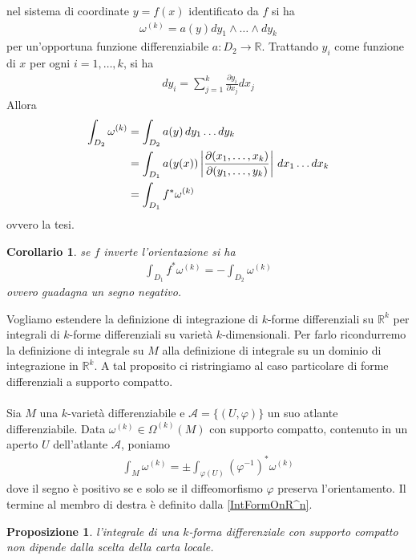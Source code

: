 \documentclass[oneside, 11pt]{amsbook}
\makeatletter
\newcommand{\0}{{(0)}}
\newcommand{\3}{{(3)}}
\theoremstyle{colonplain}
\newtheorem{prop}[thm]{Proposizione}
\newtheorem{cor}[thm]{Corollario}
\theoremstyle{colondefinition}
\theoremstyle{colonremark}
\numberwithin{equation}{chapter}
\renewcommand{\proofname}{Dimostrazione}
\renewenvironment{proof}[1][\proofname]{\par
  \pushQED{\qed}%
  \normalfont \topsep6\p@\@plus6\p@\relax
  \trivlist
  \item[\hskip\labelsep\bfseries #1:]\ignorespaces
}{%
  \popQED\endtrivlist\@endpefalse
}
\makeatother
\begin{document}
\begin{proof} nel sistema di coordinate $y = f(x)$ identificato da $f$ si ha
\begin{align}
    \omega^{(k)} = a(y)dy_1 \wedge \dots \wedge dy_k 
\end{align}
per un'opportuna funzione differenziabile $a : D_2 \longrightarrow \mathbb{R}$. Trattando $y_i$ come funzione di $x$ per ogni $i = 1, \dots, k$, si ha
\begin{align}
    dy_i = \sum_{j = 1}^k \frac{\partial y_i}{\partial x_j}dx_j 
\end{align}
Allora
\begin{align}
    \int_{D_2} \omega^{(k)} &= \int_{D_2} a(y) \, dy_1 \dots dy_k \notag \\
    &= \int_{D_1} a(y(x))\left|\frac{\partial(x_1, \dots, x_k)}{\partial(y_1, \dots, y_k)}\right| \, dx_1 \dots dx_k \notag \\
    &= \int_{D_1} f^*\omega^{(k)} 
\end{align}
ovvero la tesi.
\end{proof}
\begin{cor}
    se $f$ inverte l'orientazione si ha
\begin{align}
    \int_{D_1} f^*\omega^{(k)} = -\int_{D_2} \omega^{(k)} 
\end{align}
ovvero guadagna un segno negativo.
\end{cor}
Vogliamo estendere la definizione di integrazione di $k$-forme differenziali su $\mathbb{R}^k$ per integrali di $k$-forme differenziali su varietà $k$-dimensionali. Per farlo ricondurremo la definizione di integrale su $M$ alla definizione di integrale su un dominio di integrazione in $\mathbb{R}^k$. A tal proposito ci ristringiamo al caso particolare di forme differenziali a supporto compatto. \\ \\
Sia $M$ una $k$-varietà differenziabile e $\mathcal{A} = \{(U, \varphi)\}$ un suo atlante differenziabile. Data $\omega^{(k)} \in \Omega^{(k)}(M)$ con supporto compatto, contenuto in un aperto $U$ dell'atlante $\mathcal{A}$, poniamo
\begin{align}
    \int_M \omega^{(k)} = \pm\int_{\varphi(U)} (\varphi^{-1})^*\omega^{(k)} 
\end{align}
dove il segno è positivo se e solo se il diffeomorfismo $\varphi$ preserva l'orientamento. Il termine al membro di destra è definito dalla \eqref{IntFormOnR^n}.
\begin{prop} l'integrale di una $k$-forma differenziale con supporto compatto non dipende dalla scelta della carta locale.
\end{prop}
\end{document}
